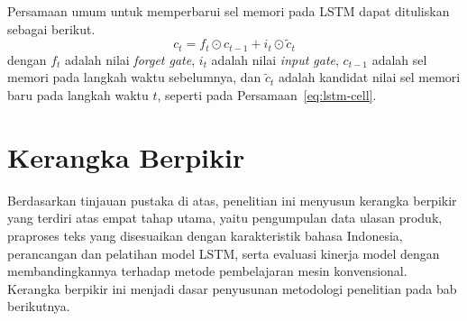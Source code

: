 Persamaan umum untuk memperbarui sel memori pada LSTM dapat dituliskan
sebagai berikut.
\begin{equation}
  c_t = f_t \odot c_{t-1} + i_t \odot \tilde{c}_t
  \label{eq:lstm-cell}
\end{equation}
dengan $f_t$ adalah nilai \textit{forget gate}, $i_t$ adalah nilai
\textit{input gate}, $c_{t-1}$ adalah sel memori pada langkah waktu
sebelumnya, dan $\tilde{c}_t$ adalah kandidat nilai sel memori baru
pada langkah waktu $t$, seperti pada Persamaan~\eqref{eq:lstm-cell}.

\section{Kerangka Berpikir}
Berdasarkan tinjauan pustaka di atas, penelitian ini menyusun
kerangka berpikir yang terdiri atas empat tahap utama, yaitu
pengumpulan data ulasan produk, praproses teks yang disesuaikan
dengan karakteristik bahasa Indonesia, perancangan dan pelatihan
model LSTM, serta evaluasi kinerja model dengan membandingkannya
terhadap metode pembelajaran mesin konvensional. Kerangka berpikir
ini menjadi dasar penyusunan metodologi penelitian pada bab
berikutnya.
